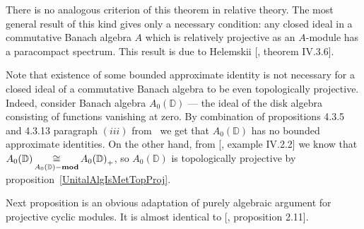 There is no analogous criterion of this theorem in relative theory. The most
general result of this kind gives only a necessary condition: any closed ideal in a
commutative Banach algebra $A$ which is relatively projective as an $A$-module has
a paracompact spectrum. This result is due to Helemskii
[\cite{HelHomolBanTopAlg}, theorem IV.3.6]. 

Note that existence of some bounded approximate identity is not necessary 
for a closed ideal of a commutative Banach algebra to be even 
topologically projective. Indeed, consider Banach algebra  
$A_0(\mathbb{D})$ --- the ideal of the disk algebra consisting of functions 
vanishing at zero. By combination of propositions 4.3.5 and 4.3.13 
paragraph $(iii)$ from~\cite{DalBanAlgAutCont} we get that $A_0(\mathbb{D})$ 
has no bounded approximate identities. On the other hand, 
from [\cite{HelBanLocConvAlg}, example IV.2.2] we know that
$A_0(\mathbb{D})\mathop{\mathbin{\cong}}\limits_{A_0(\mathbb{D})-\mathbf{mod}} {A_0(\mathbb{D})}_+$, so
$A_0(\mathbb{D})$ is topologically projective by
proposition~\ref{UnitalAlgIsMetTopProj}.

Next proposition is an obvious adaptation of purely algebraic argument for
projective cyclic modules. It is almost identical to [\cite{WhiteInjmoduAlg},
proposition 2.11].

